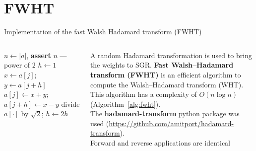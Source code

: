 \section{FWHT}

\begin{frame}{Implementation of the fast Walsh Hadamard transform (FWHT)}
    \begin{columns}
            \begin{algorithm}[H]
                \caption{Fast Walsh–Hadamard Transform}
                \begin{algorithmic}[1]
                    \State $n \gets |a|$, \textbf{assert} $n$ — power of $2$
                    \State $h \gets 1$
                            \State $x \gets a[j]$; $y \gets a[j+h]$
                            \State $a[j] \gets x+y$; \quad $a[j+h] \gets x-y$
                        \EndFor
                        \EndFor
                        \State  divide $a[\cdot]$ by $\sqrt{2}$; \quad $h \gets 2h$
                    \EndWhile
                    \EndProcedure
                \end{algorithmic}\label{alg:fwht}
            \end{algorithm}
        
            \small
            A random Hadamard transformation is used to bring the weights to SGR.\@
            \textbf{Fast Walsh–Hadamard transform (FWHT)} is an efficient algorithm to compute the Walsh–Hadamard transform (WHT). This algorithm has a complexity of $O(n\log n)$ (Algorithm~\ref{alg:fwht}).\\
            The \textbf{hadamard-transform} python package was used (\url{https://github.com/amitport/hadamard-transform}).\\
            Forward and reverse applications are identical

    \end{columns}

\end{frame}

